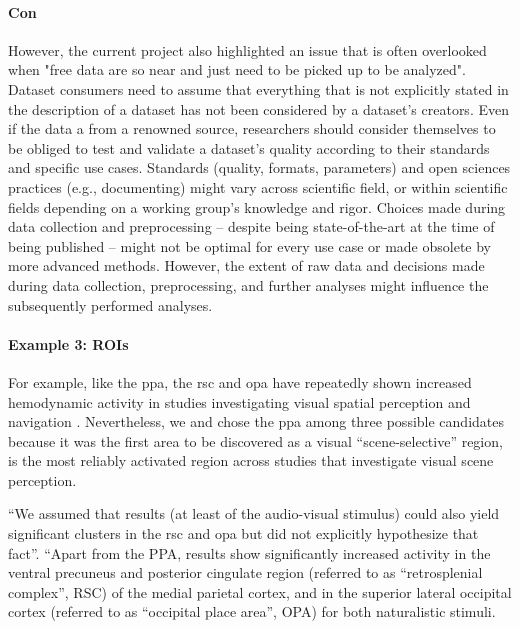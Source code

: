 \paragraph{Con}
%
However, the current project also highlighted an issue that is often overlooked
when "free data are so near and just need to be picked up to be analyzed".
Dataset consumers need to assume that everything that is not explicitly
stated in the description of a dataset has not been considered by a dataset's
creators.
Even if the data a from a renowned source, researchers should consider
themselves to be obliged to test and validate a dataset's quality according to
their standards and specific use cases.
%
Standards (quality, formats, parameters) and open sciences practices (e.g.,
documenting) might vary across scientific field, or within scientific fields
depending on a working group's knowledge and rigor.
%
Choices made during data collection and preprocessing -- despite being
state-of-the-art at the time of being published -- might not be optimal for
every use case or made obsolete by more advanced methods.
%
However, the extent of raw data and decisions made during data collection,
preprocessing, and further analyses might influence the subsequently performed
analyses.


\paragraph{Example 3: ROIs}
%
For example, like the \ac{ppa}, the \ac{rsc} and \ac{opa} have repeatedly shown
increased hemodynamic activity in studies investigating visual spatial
perception and navigation \citep{chrastil2018heterogeneity, bettencourt2013role,
dilks2013occipital, epstein2019scene}.
%
Nevertheless, we and \citet{sengupta2016extension} chose the \ac{ppa} among
three possible candidates because it was the first area to be discovered as a
visual ``scene-selective'' region, is the most reliably activated region across
studies that investigate visual scene perception.

%
``We assumed that results (at least of the audio-visual stimulus) could also
yield significant clusters in the \ac{rsc} and \ac{opa} but did not explicitly
hypothesize that fact''.
%
``Apart from the PPA, results show significantly increased activity in the
ventral precuneus and posterior cingulate region (referred to as ``retrosplenial
complex'', RSC) of the medial parietal cortex, and in the superior lateral
occipital cortex (referred to as ``occipital place area'', OPA) for both
naturalistic stimuli.

